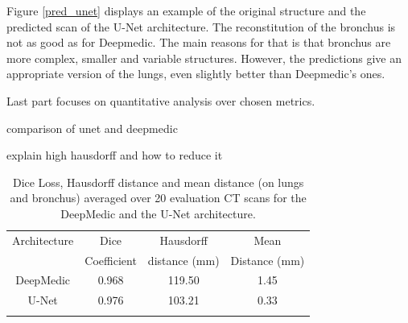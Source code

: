 Figure \ref{pred_unet} displays an example of the original structure and the predicted scan of the U-Net architecture. The reconstitution of the bronchus is not as good as for Deepmedic. The main reasons for that is that bronchus are more complex, smaller and variable structures. However, the predictions give an appropriate version of the lungs, even slightly better than Deepmedic's ones.\newline\newline

Last part focuses on quantitative analysis over chosen metrics.




comparison of unet and deepmedic

explain high hausdorff and how to reduce it


\begin{table}[h!]
	\caption{Dice Loss, Hausdorff distance and mean distance (on lungs and bronchus) averaged over 20 evaluation CT scans for the DeepMedic and the U-Net architecture.}
	\label{table_result}
	\centering
	\setlength{\tabcolsep}{10pt}
	\renewcommand{\arraystretch}{1.5}
	\begin{tabular}{c c c c}
		\hline 
		Architecture & Dice & Hausdorff & Mean \\
		& Coefficient & distance (mm) & Distance (mm) \\ 
		\hline 
		DeepMedic & 0.968 & 119.50 & 1.45 \\ 
		U-Net & 0.976 & 103.21 & 0.33 \\ 
		\hline
		\newline 
	\end{tabular}

\end{table}
